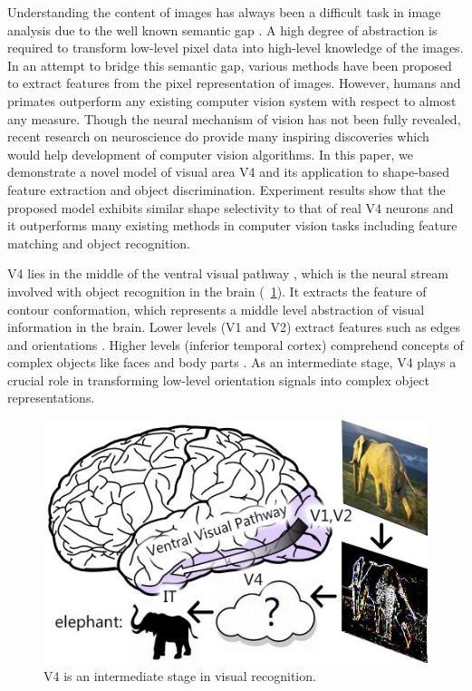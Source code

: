 \documentclass[twocolumn]{article}
\begin{document}
Understanding the content of images has always been a difficult task in image analysis due to the well known semantic gap \cite{smeulders2000}.
A high degree of abstraction is required to transform low-level pixel data into high-level knowledge of the images.
In an attempt to bridge this semantic gap, various methods have been proposed to extract features from the pixel representation of images.
However, humans and primates outperform any existing computer vision system with respect to almost any measure.
Though the neural mechanism of vision has not been fully revealed,
recent research on neuroscience do provide many inspiring discoveries which would help development of computer vision algorithms.
In this paper, we demonstrate a novel model of visual area V4 and its application to shape-based feature extraction and object discrimination.
Experiment results show that the proposed model exhibits similar shape selectivity to that of real V4 neurons
and it outperforms many existing methods in computer vision tasks including feature matching and object recognition. 

V4 lies in the middle of the ventral visual pathway \cite{ettlinger1990}, 
which is the neural stream involved with object recognition in the brain (\figurename~\ref{fig:1}).
It extracts the feature of contour conformation, which represents a middle level abstraction of visual information in the brain.
Lower levels (V1 and V2) extract features such as edges and orientations \cite{hubel1962}.
Higher levels (inferior temporal cortex) comprehend concepts of complex objects like faces and body parts \cite{bell2009}.
As an intermediate stage, V4 plays a crucial role in transforming low-level orientation signals into complex object representations.

\begin{figure}
\centerline{\includegraphics[width=0.8\linewidth]{images/fig1.jpg}} 
\caption{V4 is an intermediate stage in visual recognition.}
\label{fig:1}
\end{figure}
\end{document}
